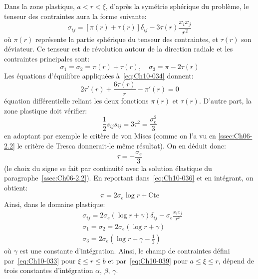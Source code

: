 Dans la zone plastique, $a<r<\xi$, d'après la symétrie sphérique du problème, le tenseur des contraintes aura la forme suivante: 
\begin{equation}
    \sigma_{ij} = \left[ \pi(r) + \tau(r) \right] \delta_{ij} - 3 \tau(r) \frac{x_ix_j}{r^2}
    \label{eq:Ch10-034}
\end{equation}
où $\pi(r)$ représente la partie sphérique du tenseur des contraintes, et $\tau(r)$ son déviateur.
Ce tenseur est de révolution autour de la direction radiale et les contraintes principales sont: 
\begin{equation}
    \sigma_1 = \sigma_2 = \pi(r) + \tau(r) ,\quad \sigma_3 = \pi - 2\tau(r)
    \label{eq:Ch10-035}
\end{equation}
Les équations d'équilibre appliquées à~\eqref{eq:Ch10-034} donnent: 
\begin{equation}
    2\tau'(r) + \frac{6\tau(r)}{r} - \pi'(r) = 0
    \label{eq:Ch10-036}
\end{equation}
équation différentielle reliant les deux fonctions $\pi(r)$ et $\tau(r)$. 
D'autre part, la zone plastique doit vérifier: 
\[
\frac{1}{2} s_{ij} s_{ij} = 3 \tau^2 = \frac{\sigma_e^2}{3}
\]
en adoptant par exemple le critère de von Mises (comme on l'a vu en \ref{ssec:Ch06-2.2} le critère de Tresca donnerait-le même résultat).
On en déduit donc: 
\begin{equation}
    \tau = + \frac{\sigma_e}{3}
    \label{eq:Ch10-037}
\end{equation}
(le choix du signe se fait par continuité avec la solution élastique du paragraphe~\ref{ssec:Ch06-2.2}).
En reportant dans~\eqref{eq:Ch10-036} et en intégrant, on obtient: 
\begin{equation}
    \pi = 2 \sigma_e \log r + \text{Cte}
    \label{eq:Ch10-038}
\end{equation}
Ainsi, dans le domaine plastique: 
\begin{equation}\begin{aligned}
   & \sigma_{ij} = 2 \sigma_e \left( \log r + \gamma \right) \delta_{ij} - \sigma_e \frac{x_ix_j}{r^2}\\
   & \sigma_1 = \sigma_2 = 2 \sigma_e \left( \log r + \gamma \right)\\&\sigma_3 = 2 \sigma_e \left( \log r + \gamma - \frac{1}{2} \right)
\end{aligned}
    \label{eq:Ch10-040}
\end{equation}
où $\gamma$ est une constante d'intégration.
Ainsi, le champ de contraintes défini par~\eqref{eq:Ch10-033} pour $\xi \leq r \leq b$ et par~\eqref{eq:Ch10-039} pour $a \leq \xi \leq r$, dépend de trois constantes d'intégration $\alpha$, $\beta$, $\gamma$.
